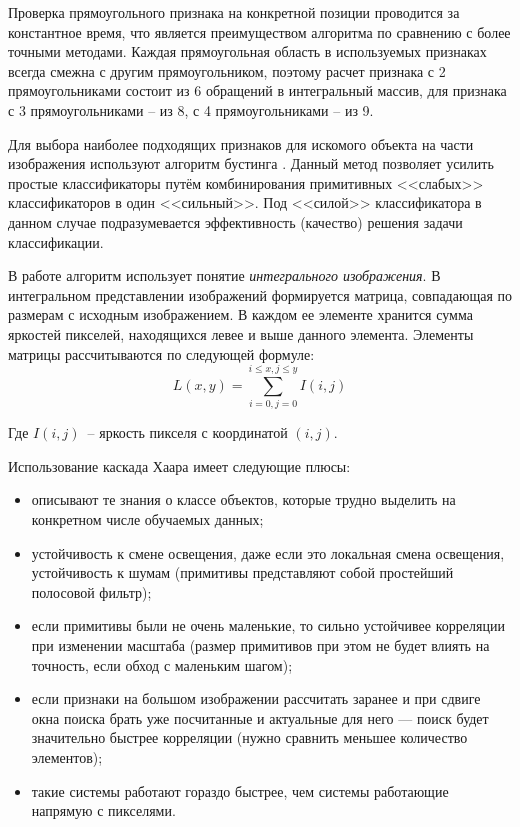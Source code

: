 Проверка прямоугольного признака на конкретной позиции проводится за константное время, что является преимуществом алгоритма по сравнению
с более точными методами. Каждая прямоугольная область в используемых признаках всегда смежна с другим прямоугольником, поэтому
расчет признака с 2 прямоугольниками состоит из 6 обращений в интегральный массив, для признака с 3 прямоугольниками -- из 8, с 4
прямоугольниками -- из 9.

Для выбора наиболее подходящих признаков для искомого объекта 
на части изображения используют алгоритм бустинга \cite{viola_jones_2}. Данный метод 
позволяет усилить простые классификаторы путём комбинирования 
примитивных <<слабых>> классификаторов в один <<сильный>>. Под <<силой>>
классификатора в данном случае подразумевается эффективность 
(качество) решения задачи классификации.

В работе алгоритм использует понятие \textit{интегрального изображения}.
В интегральном представлении изображений формируется матрица, совпадающая по размерам с
исходным изображением. В каждом ее элементе хранится сумма яркостей пикселей, находящихся левее и
выше данного элемента. Элементы матрицы рассчитываются по следующей формуле:
$$
    L(x, y) = \sum_{i = 0, j = 0}^{i \leq x, j \leq y}I(i,j)
$$

Где $I(i,j)$~-- яркость пикселя с координатой $(i, j)$.

Использование каскада Хаара имеет следующие плюсы:
\begin{itemize}
    \item описывают те знания о классе объектов, которые трудно 
        выделить на конкретном числе обучаемых данных;
    \item устойчивость к смене освещения, даже если это локальная 
        смена освещения, устойчивость к шумам (примитивы представляют собой 
        простейший полосовой фильтр);
    \item если примитивы были не очень маленькие, то сильно 
        устойчивее корреляции при изменении масштаба (размер примитивов при 
        этом не будет влиять на точность, если обход с маленьким шагом);
    \item если признаки на большом изображении рассчитать заранее и 
        при сдвиге окна поиска брать уже посчитанные и актуальные для него — 
        поиск будет значительно быстрее корреляции (нужно сравнить меньшее 
        количество элементов);
    \item такие системы работают гораздо быстрее, чем системы 
        работающие напрямую с пикселями. 
\end{itemize}

